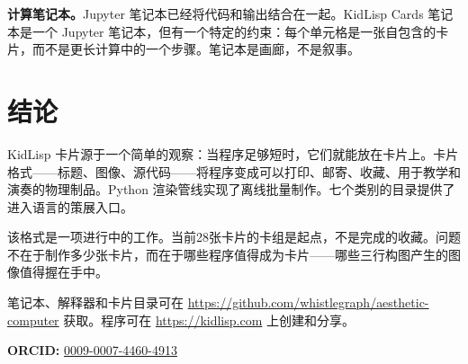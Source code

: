 \documentclass[10pt,letterpaper,twocolumn]{article}
\begin{document}
\textbf{计算笔记本。}Jupyter 笔记本已经将代码和输出结合在一起。KidLisp Cards 笔记本是一个 Jupyter 笔记本，但有一个特定的约束：每个单元格是一张自包含的卡片，而不是更长计算中的一个步骤。笔记本是画廊，不是叙事。


\section{结论}

KidLisp 卡片源于一个简单的观察：当程序足够短时，它们就能放在卡片上。卡片格式------标题、图像、源代码------将程序变成可以打印、邮寄、收藏、用于教学和演奏的物理制品。Python 渲染管线实现了离线批量制作。七个类别的目录提供了进入语言的策展入口。

该格式是一项进行中的工作。当前28张卡片的卡组是起点，不是完成的收藏。问题不在于制作多少张卡片，而在于哪些程序值得成为卡片------哪些三行构图产生的图像值得握在手中。

笔记本、解释器和卡片目录可在 \url{https://github.com/whistlegraph/aesthetic-computer} 获取。程序可在 \url{https://kidlisp.com} 上创建和分享。

\vspace{0.5em}
\noindent\textbf{ORCID:} \href{https://orcid.org/0009-0007-4460-4913}{0009-0007-4460-4913}




\end{document}
